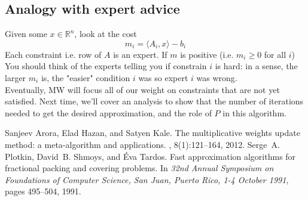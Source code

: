 \documentclass[11pt]{article}
\begin{document}
\subsection{Analogy with expert advice}
Given some $x\in \mathbb{R}^n$, look at the cost
\begin{equation}
m_i = \langle A_i, x\rangle - b_i
\end{equation}
Each constraint i.e. row of $A$ is an expert. If $m$ is positive (i.e. $m_i\ge 0$ for all $i$) You should think of the experts telling you if constrain $i$ is hard: in a sense, the larger $m_i$ is, the "easier" condition $i$ was so expert $i$ was wrong.\medskip\\
Eventually, MW will focus all of our weight on constraints that are not yet satisfied. Next time, we'll cover an analysis to show that the number of iterations needed to get the desired approximation, and the role of $P$ in this algorithm.

\begin{thebibliography}{}
Sanjeev Arora, Elad Hazan, and Satyen Kale.
\newblock The multiplicative weights update method: a meta-algorithm and
  applications.
, 8(1):121--164, 2012.
Serge~A. Plotkin, David~B. Shmoys, and {\'{E}}va Tardos.
\newblock Fast approximation algorithms for fractional packing and covering
  problems.
\newblock In {\em 32nd Annual Symposium on Foundations of Computer Science, San
  Juan, Puerto Rico, 1-4 October 1991}, pages 495--504, 1991.
\end{thebibliography}
\end{document}
